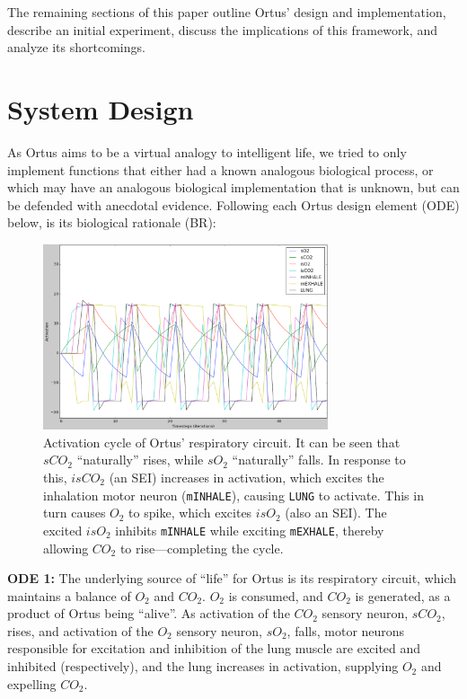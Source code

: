 \documentclass[letterpaper]{article}
\begin{document}
The remaining sections of this paper outline Ortus' design and implementation, describe an initial experiment, discuss the implications of this framework, and analyze its shortcomings.

\section{System Design}


As Ortus aims to be a virtual analogy to intelligent life, we tried to only implement functions that either had a known analogous biological process, or which may have an analogous biological implementation that is unknown, but can be defended with anecdotal evidence. Following each Ortus design element (ODE) below, is its biological rationale (BR):


\begin{figure}
\begin{center}
\includegraphics[width=3.3in]{images/respiration.png}
\caption{Activation cycle of Ortus' respiratory circuit. It can be seen that $sCO_2$ ``naturally'' rises, while $sO_2$ ``naturally'' falls. In response to this, $isCO_2$ (an SEI) increases in activation, which excites the inhalation motor neuron (\texttt{mINHALE}), causing \texttt{LUNG} to activate. This in turn causes $O_2$ to spike, which excites $isO_2$ (also an SEI). The excited $isO_2$ inhibits \texttt{mINHALE} while exciting \texttt{mEXHALE}, thereby allowing $CO_2$ to rise---completing the cycle.}
\label{respiration}
\end{center}
\end{figure}


\textbf{ODE 1:} The underlying source of ``life'' for Ortus is its respiratory circuit, which maintains a balance of $O_2$ and $CO_2$. $O_2$ is consumed, and $CO_2$ is generated, as a product of Ortus being ``alive''. As activation of the $CO_2$ sensory neuron, $sCO_2$, rises, and activation of the $O_2$ sensory neuron, $sO_2$, falls, motor neurons responsible for excitation and inhibition of the lung muscle are excited and inhibited (respectively), and the lung increases in activation, supplying $O_2$ and expelling $CO_2$. 
\end{document}
